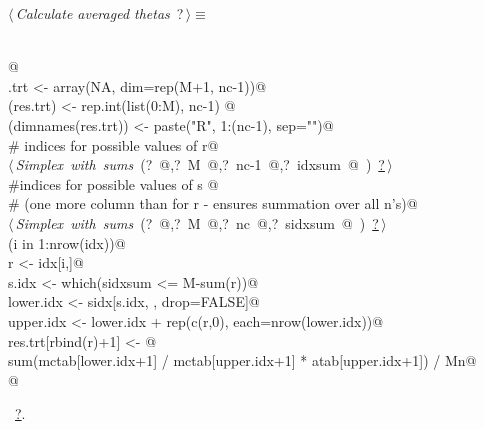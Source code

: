 \documentclass[reqno]{amsart}
\renewcommand{\NWtarget}[2]{\hypertarget{#1}{#2}}
\renewcommand{\NWlink}[2]{\hyperlink{#1}{#2}}
\begin{document}
\begin{flushleft} \small\label{scrap4}\raggedright\small
\NWtarget{nuweb?}{} $\langle\,${\itshape Calculate averaged thetas}\nobreak\ {\footnotesize {?}}$\,\rangle\equiv$
\vspace{-1ex}
\begin{list}{}{} \item
\mbox{}\verb@@\\
\mbox{}\verb@    @\\
\mbox{}\verb@res.trt <- array(NA, dim=rep(M+1, nc-1))@\\
\mbox{}\verb@dimnames(res.trt) <- rep.int(list(0:M), nc-1) @\\
\mbox{}\verb@names(dimnames(res.trt)) <- paste("R", 1:(nc-1), sep="")@\\
\mbox{}\verb@# indices for possible values of r@\\
\mbox{}\verb@@\hbox{$\langle\,${\itshape Simplex with sums}\nobreak\ ({\footnotesize ?\label{scrap5}
 }\mbox{}\verb@idx @,{\footnotesize ?\label{scrap6}
 }\mbox{}\verb@ M @,{\footnotesize ?\label{scrap7}
 }\mbox{}\verb@ nc-1 @,{\footnotesize ?\label{scrap8}
 }\mbox{}\verb@ idxsum @ ) {\footnotesize \NWlink{nuweb?}{?}}$\,\rangle$}\verb@@\\
\mbox{}\verb@#indices for possible values of s @\\
\mbox{}\verb@# (one more column than for r - ensures summation over all n's)@\\
\mbox{}\verb@@\hbox{$\langle\,${\itshape Simplex with sums}\nobreak\ ({\footnotesize ?\label{scrap9}
 }\mbox{}\verb@sidx @,{\footnotesize ?\label{scrap10}
 }\mbox{}\verb@ M @,{\footnotesize ?\label{scrap11}
 }\mbox{}\verb@ nc @,{\footnotesize ?\label{scrap12}
 }\mbox{}\verb@ sidxsum @ ) {\footnotesize \NWlink{nuweb?}{?}}$\,\rangle$}\verb@@\\
\mbox{}\verb@for (i in 1:nrow(idx)){@\\
\mbox{}\verb@  r <- idx[i,]@\\
\mbox{}\verb@  s.idx <- which(sidxsum <= M-sum(r))@\\
\mbox{}\verb@  lower.idx <- sidx[s.idx, , drop=FALSE]@\\
\mbox{}\verb@  upper.idx <- lower.idx + rep(c(r,0), each=nrow(lower.idx))@\\
\mbox{}\verb@  res.trt[rbind(r)+1] <- @\\
\mbox{}\verb@    sum(mctab[lower.idx+1] / mctab[upper.idx+1] * atab[upper.idx+1]) / Mn@\\
\mbox{}\verb@}@\\
\mbox{}\verb@@{\NWsep}
\end{list}
\vspace{-1.5ex}
\footnotesize
\begin{list}{}{\setlength{\itemsep}{-\parsep}\setlength{\itemindent}{-\leftmargin}}
\item \NWtxtMacroRefIn\ \NWlink{nuweb?}{?}.

\item{}
\end{list}
\vspace{4ex}
\end{flushleft}
\end{document}
